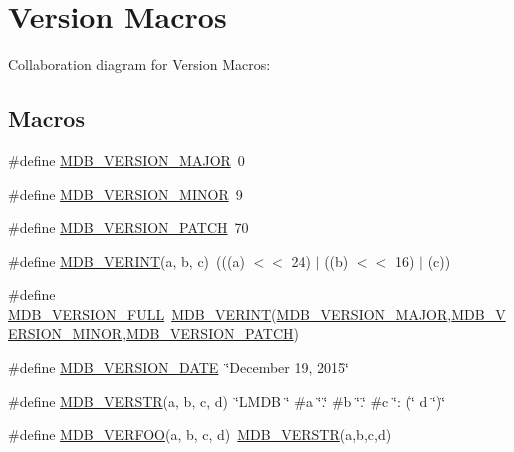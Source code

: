 \hypertarget{group___version}{}\section{Version Macros}
\label{group___version}
Collaboration diagram for Version Macros\+:
\subsection*{Macros}
\begin{DoxyCompactItemize}
\item 
\#define \mbox{\hyperlink{group___version_ga4d29d48a85ec25636fac7831b8b9b807}{M\+D\+B\+\_\+\+V\+E\+R\+S\+I\+O\+N\+\_\+\+M\+A\+J\+OR}}~0
\item 
\#define \mbox{\hyperlink{group___version_ga44da0474969d76ad5521f8b7de4dd32f}{M\+D\+B\+\_\+\+V\+E\+R\+S\+I\+O\+N\+\_\+\+M\+I\+N\+OR}}~9
\item 
\#define \mbox{\hyperlink{group___version_gaeddac7231e1cdcbe2b7541cbfa33e82a}{M\+D\+B\+\_\+\+V\+E\+R\+S\+I\+O\+N\+\_\+\+P\+A\+T\+CH}}~70
\item 
\#define \mbox{\hyperlink{group___version_gaa50172fa8a795f877c9304d29aefb14b}{M\+D\+B\+\_\+\+V\+E\+R\+I\+NT}}(a,  b,  c)~(((a) $<$$<$ 24) $\vert$ ((b) $<$$<$ 16) $\vert$ (c))
\item 
\#define \mbox{\hyperlink{group___version_gaf76019a5896eaa538be876942c28f262}{M\+D\+B\+\_\+\+V\+E\+R\+S\+I\+O\+N\+\_\+\+F\+U\+LL}}~\mbox{\hyperlink{group___version_gaa50172fa8a795f877c9304d29aefb14b}{M\+D\+B\+\_\+\+V\+E\+R\+I\+NT}}(\mbox{\hyperlink{group___version_ga4d29d48a85ec25636fac7831b8b9b807}{M\+D\+B\+\_\+\+V\+E\+R\+S\+I\+O\+N\+\_\+\+M\+A\+J\+OR}},\mbox{\hyperlink{group___version_ga44da0474969d76ad5521f8b7de4dd32f}{M\+D\+B\+\_\+\+V\+E\+R\+S\+I\+O\+N\+\_\+\+M\+I\+N\+OR}},\mbox{\hyperlink{group___version_gaeddac7231e1cdcbe2b7541cbfa33e82a}{M\+D\+B\+\_\+\+V\+E\+R\+S\+I\+O\+N\+\_\+\+P\+A\+T\+CH}})
\item 
\#define \mbox{\hyperlink{group___version_ga24212e54d8dc0e0949970b5995b3b663}{M\+D\+B\+\_\+\+V\+E\+R\+S\+I\+O\+N\+\_\+\+D\+A\+TE}}~\char`\"{}December 19, 2015\char`\"{}
\item 
\#define \mbox{\hyperlink{group___version_ga1e8ad3b918e27a5a55179c1ab4b2e0d1}{M\+D\+B\+\_\+\+V\+E\+R\+S\+TR}}(a,  b,  c,  d)~\char`\"{}L\+M\+DB \char`\"{} \#a \char`\"{}.\char`\"{} \#b \char`\"{}.\char`\"{} \#c \char`\"{}\+: (\char`\"{} d \char`\"{})\char`\"{}
\item 
\#define \mbox{\hyperlink{group___version_ga9e259368ceadd84622c214f0c7442970}{M\+D\+B\+\_\+\+V\+E\+R\+F\+OO}}(a,  b,  c,  d)~\mbox{\hyperlink{group___version_ga1e8ad3b918e27a5a55179c1ab4b2e0d1}{M\+D\+B\+\_\+\+V\+E\+R\+S\+TR}}(a,b,c,d)

\end{DoxyCompactItemize}
